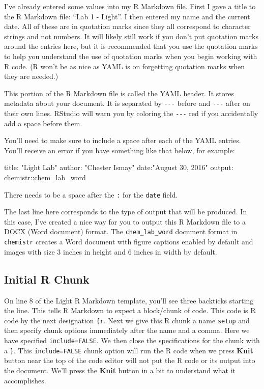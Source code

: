 \documentclass[]{tufte-book}
\newenvironment{Shaded}{\begin{snugshade}}{\end{snugshade}}
\newcommand{\StringTok}[1]{\textcolor[rgb]{0.31,0.60,0.02}{{#1}}}
\newcommand{\FunctionTok}[1]{\textcolor[rgb]{0.00,0.00,0.00}{{#1}}}
\newcommand{\NormalTok}[1]{{#1}}
\begin{document}
I've already entered some values into my R Markdown file. First I gave a
title to the R Markdown file: ``Lab 1 - Light''. I then entered my name
and the current date. All of these are in quotation marks since they all
correspond to character strings and not numbers. It will likely still
work if you don't put quotation marks around the entries here, but it is
recommended that you use the quotation marks to help you understand the
use of quotation marks when you begin working with R code. (R won't be
as nice as YAML is on forgetting quotation marks when they are needed.)

This portion of the R Markdown file is called the YAML header. It stores
metadata about your document. It is separated by \texttt{-\/-\/-} before
and \texttt{-\/-\/-} after on their own lines. RStudio will warn you by
coloring the \texttt{-\/-\/-} red if you accidentally add a space before
them.

You'll need to make sure to include a space after each of the YAML
entries. You'll receive an error if you have something like that below,
for example:

\begin{Shaded}
\begin{Highlighting}[]
\FunctionTok{title:} \StringTok{"Light Lab"}
\FunctionTok{author:} \StringTok{"Chester Ismay"}
\FunctionTok{date:}\StringTok{"August 30, 2016"}
\FunctionTok{output:} \NormalTok{chemistr::chem_lab_word}
\end{Highlighting}
\end{Shaded}

There needs to be a space after the \texttt{:} for the \texttt{date}
field.

The last line here corresponds to the type of output that will be
produced. In this case, I've created a nice way for you to output this R
Markdown file to a DOCX (Word document) format. The
\texttt{chem\_lab\_word} document format in \texttt{chemistr} creates a
Word document with figure captions enabled by default and images with
size 3 inches in height and 6 inches in width by default.

\subsection{Initial R Chunk}\label{initial-r-chunk}

On line 8 of the Light R Markdown template, you'll see three backticks
starting the line. This tells R Markdown to expect a block/chunk of
code. This code is R code by the next designation \texttt{\{r}. Next we
give this R chunk a name \texttt{setup} and then specify chunk options
immediately after the name and a comma. Here we have specified
\texttt{include=FALSE}. We then close the specifications for the chunk
with a \texttt{\}}. This \texttt{include=FALSE} chunk option will run
the R code when we press \textbf{Knit} button near the top of the code
editor will not put the R code or its output into the document. We'll
press the \textbf{Knit} button in a bit to understand what it
accomplishes.
\end{document}
